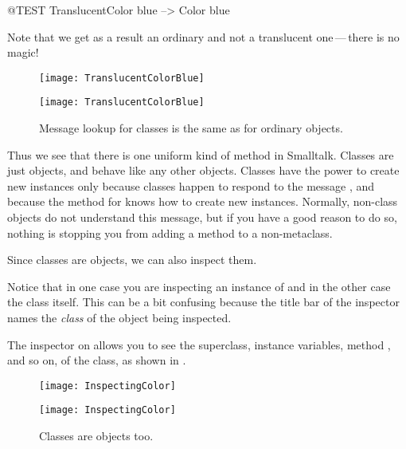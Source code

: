 \documentclass[a4paper,10pt,twoside]{book}
\begin{document}
\begin{code}{@TEST}
TranslucentColor blue --> Color blue
\end{code}
\noindent
Note that we get as a result an ordinary  and not a translucent one\,---\,there is no magic!

\begin{center}
\begin{figure}[!ht]
\ifluluelse
	{\centerline {\texttt{[image: TranslucentColorBlue]}}}
	{\centerline {\texttt{[image: TranslucentColorBlue]}}}
\caption{Message lookup for classes is the same as for ordinary objects.\label{fig:metaclasslookup}}
\end{figure}
\end{center}

Thus we see that there is one uniform kind of method  in Smalltalk.
Classes are just objects, and behave like any other objects.
Classes have the power to create new instances only because classes happen to respond to the message , and because the method for  knows how to create new instances.
Normally, non-class objects do not understand this message, but if you have a good reason to do so, nothing is stopping you from adding a  method to a non-metaclass.

Since classes are objects, we can also inspect them.


\noindent
Notice that in one case you are inspecting an instance of  and in the other case the  class itself.
This can be a bit confusing because the title bar of the inspector names the \emph{class} of the object being inspected.

The inspector on  allows you to see the superclass, instance variables, method , and so on, of the  class, as shown in .

\begin{center}
\begin{figure}[!ht]
\ifluluelse
	{\centerline{\texttt{[image: InspectingColor]}}}
	{\centerline{\texttt{[image: InspectingColor]}}}
\caption{Classes are objects too.\label{fig:inspectingColor}}
\end{figure}
\end{center}
\end{document}
